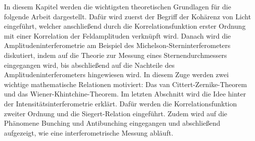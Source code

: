 In diesem Kapitel werden die wichtigsten theoretischen Grundlagen für die folgende Arbeit dargestellt. 
Dafür wird zuerst der Begriff der Kohärenz von Licht eingeführt, welcher anschließend durch die Korrelationsfunktion erster Ordnung mit einer Korrelation der Feldamplituden verknüpft wird. 
Danach wird die Amplitudeninterferometrie am Beispiel des Michelson-Sterninterferometers diskutiert, indem auf die Theorie zur Messung eines Sternendurchmessers eingegangen wird, bis abschließend auf die Nachteile des Amplitudeninterferometers hingewiesen wird. 
In diesem Zuge werden zwei wichtige mathematische Relationen motiviert: Das van Cittert-Zernike-Theorem und das Wiener-Khintchine-Theorem. 
Im letzten Abschnitt wird die Idee hinter der Intensitätsinterferometrie erklärt. 
Dafür werden die Korrelationsfunktion zweiter Ordnung und die Siegert-Relation eingeführt. 
Zudem wird auf die Phänomene Bunching und Antibunching eingegangen und abschließend aufgezeigt, wie eine interferometrische Messung abläuft. 


